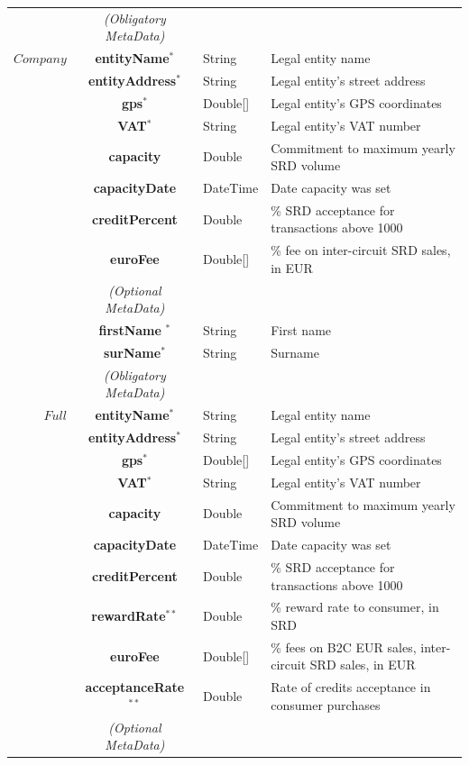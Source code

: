\begin{table}[H]
\begin{centering}
{\begin{tabular}{ r | c | l | l }
\Xhline{1.5pt}
			& \emph{(Obligatory MetaData)} & & \\
\cline{2-2}
$Company$	& {\bf entityName}$^*$		&String	& Legal entity name \\
			& {\bf entityAddress}$^*$		&String	& Legal entity's street address \\
			& {\bf gps}$^*$				&Double[]	& Legal entity's GPS coordinates \\
			& {\bf VAT}$^*$				&String	& Legal entity's VAT number \\
			& {\bf capacity}				&Double	& Commitment to maximum yearly SRD volume \\
			& {\bf capacityDate}			&DateTime & Date capacity was set \\
			& {\bf creditPercent}			&Double	& \% SRD acceptance for transactions above 1000 \\
			& {\bf euroFee}				&Double[]	& \% fee on inter-circuit SRD sales, in EUR \\
\cline{2-2}
			 & \emph{(Optional MetaData)}& & \\
\cline{2-2}
			& {\bf firstName	}$^*$			&String & First name \\
			& {\bf surName}$^*$			&String & Surname \\
\Xhline{1.5pt}
			& \emph{(Obligatory MetaData)} & & \\
\cline{2-2}
$Full$		& {\bf entityName}$^*$		&String	& Legal entity name \\
			& {\bf entityAddress}$^*$		&String	& Legal entity's street address \\
			& {\bf gps}$^*$				&Double[]	& Legal entity's GPS coordinates \\
			& {\bf VAT}$^*$				&String	& Legal entity's VAT number \\
			& {\bf capacity}				&Double	& Commitment to maximum yearly SRD volume \\
			& {\bf capacityDate}			&DateTime & Date capacity was set \\
			& {\bf creditPercent}			&Double	& \% SRD acceptance for transactions above 1000 \\
			& {\bf rewardRate}$^{**}$		&Double	& \% reward rate to consumer, in SRD \\
			& {\bf euroFee}				&Double[]	& \% fees on B2C EUR sales, inter-circuit SRD sales, in EUR \\
			& {\bf acceptanceRate}$^{**}$	&Double	& Rate of credits acceptance in consumer purchases\\
\cline{2-2}
			 & \emph{(Optional MetaData)}& & \\

\end{tabular}}
\end{centering}
\end{table}
